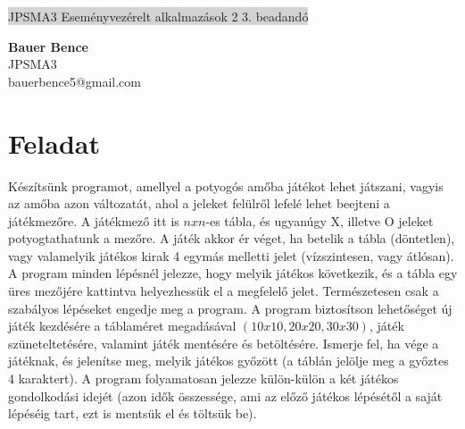\documentclass[11pt,a4paper]{article}
\begin{document}
\renewcommand{\labelitemi}{\textbullet}
\def\br{\\[0.1cm]}
\thispagestyle{empty}
\begin{center}
	\colorbox{lightgray}{{\large JPSMA3} \hspace{3cm} {\large Eseményvezérelt alkalmazások 2 3. beadandó} \hspace{5cm} \thepage}
\end{center}
\begin{framed}
	\begin{flushleft}
		{\large \textbf{Bauer Bence}}
		\hspace{5.4cm}{\large 2018.12.13.}\br
		{\large JPSMA3}\br
		{\large bauerbence5@gmail.com}
	\end{flushleft}
\end{framed}
\section{Feladat}
Készítsünk programot, amellyel a potyogós amőba játékot lehet játszani, vagyis
az amőba azon változatát, ahol a jeleket felülről lefelé lehet beejteni a
játékmezőre. A játékmező itt is $nxn$-es tábla, és ugyanúgy X, illetve O jeleket
potyogtathatunk a mezőre. A játék akkor ér véget, ha betelik a tábla (döntetlen),
vagy valamelyik játékos kirak 4 egymás melletti jelet (vízszintesen, vagy átlósan).
A program minden lépésnél jelezze, hogy melyik játékos következik, és a tábla
egy üres mezőjére kattintva helyezhessük el a megfelelő jelet. Természetesen
csak a szabályos lépéseket engedje meg a program.
A program biztosítson lehetőséget új játék kezdésére a táblaméret megadásával
$(10 x 10, 20 x 20, 30 x 30)$, játék szüneteltetésére, valamint játék mentésére és
betöltésére. Ismerje fel, ha vége a játéknak, és jelenítse meg, melyik játékos
győzött (a táblán jelölje meg a győztes 4 karaktert). A program folyamatosan
jelezze külön-külön a két játékos gondolkodási idejét (azon idők összessége, ami
az előző játékos lépésétől a saját lépéséig tart, ezt is mentsük el és töltsük be).
\end{document}
